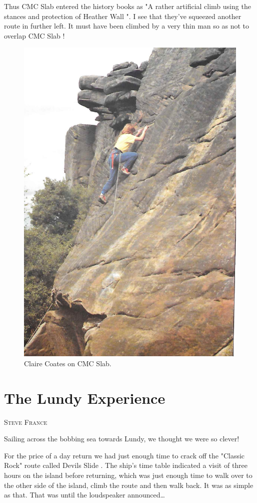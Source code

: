 \documentclass[a5paper,openany,font 10pt]{scrbook}
\makeatletter
\newcommand{\chapterauthor}[1]{%
{\parindent0pt\vspace*{-5pt}%
\linespread{1.1}\large\scshape#1%
\par\nobreak\vspace*{35pt}}
\@afterheading%
}
\makeatother
\begin{document}
Thus CMC Slab entered the history books as "A rather artificial climb
using the stances and protection of Heather Wall ". I see that they've
squeezed another route in further left.  It must have been climbed by
a very thin man so as not to overlap CMC Slab !

\begin{figure}[htb]
\centering
\includegraphics[width=.9\linewidth]{./images/Claire_Coates_on_CMC_Slab.jpg}
\caption{\label{fig:org19856a1}
Claire Coates on CMC Slab.}
\end{figure}

\chapter{The Lundy Experience}
\label{sec:org8366245}
\chapterauthor{Steve France}

Sailing across the bobbing sea towards Lundy, we thought we
were so clever!

For the price of a day return we had just enough time to
crack off the "Classic Rock" route called    Devils Slide   . The
ship's time table indicated a visit of three hours on the island
before returning, which was just enough time to walk over to the
other side of the island, climb the route and then walk back. It
was as simple as that. That was until the loudspeaker
announced\ldots{}
\end{document}
